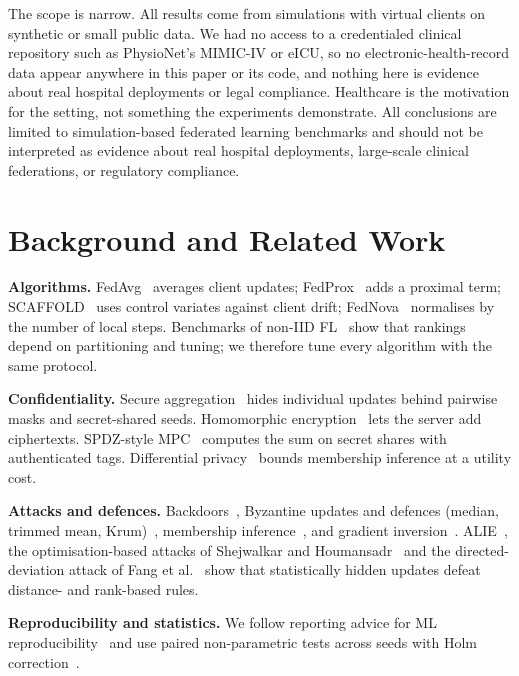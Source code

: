 \documentclass[conference]{IEEEtran}
\begin{document}
The scope is narrow. All results come from simulations with virtual clients on synthetic or small public data. We had no access to a credentialed clinical repository such as PhysioNet's MIMIC-IV or eICU, so no electronic-health-record data appear anywhere in this paper or its code, and nothing here is evidence about real hospital deployments or legal compliance. Healthcare is the motivation for the setting, not something the experiments demonstrate. All conclusions are limited to simulation-based federated learning benchmarks and should not be interpreted as evidence about real hospital deployments, large-scale clinical federations, or regulatory compliance.
\section{Background and Related Work}
\textbf{Algorithms.} FedAvg~\cite{mcmahan2017} averages client updates; FedProx~\cite{li2020fedprox} adds a proximal term; SCAFFOLD~\cite{karimireddy2020} uses control variates against client drift; FedNova~\cite{wang2020fednova} normalises by the number of local steps. Benchmarks of non-IID FL~\cite{hsu2019,li2021niid} show that rankings depend on partitioning and tuning; we therefore tune every algorithm with the same protocol.

\textbf{Confidentiality.} Secure aggregation~\cite{bonawitz2017,bell2020} hides individual updates behind pairwise masks and secret-shared seeds. Homomorphic encryption~\cite{cheon2017,fv2012,paillier1999} lets the server add ciphertexts. SPDZ-style MPC~\cite{damgard2012,beaver1991,shamir1979} computes the sum on secret shares with authenticated tags. Differential privacy~\cite{abadi2016,mironov2017,mcmahan2018dp} bounds membership inference at a utility cost.

\textbf{Attacks and defences.} Backdoors~\cite{bagdasaryan2020,sun2019,wang2020tail}, Byzantine updates and defences (median, trimmed mean, Krum)~\cite{blanchard2017,yin2018}, membership inference~\cite{shokri2017,nasr2019,carlini2022}, and gradient inversion~\cite{zhu2019,zhao2020,geiping2020}. ALIE~\cite{baruch2019}, the optimisation-based attacks of Shejwalkar and Houmansadr~\cite{shejwalkar2021} and the directed-deviation attack of Fang et al.~\cite{fang2020} show that statistically hidden updates defeat distance- and rank-based rules.

\textbf{Reproducibility and statistics.} We follow reporting advice for ML reproducibility~\cite{pineau2020,henderson2018} and use paired non-parametric tests across seeds with Holm correction~\cite{demsar2006,holm1979,wilcoxon1945}.
\end{document}
